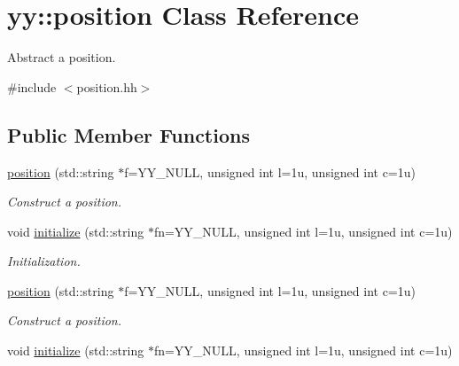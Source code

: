 \hypertarget{classyy_1_1position}{\section{yy\-:\-:position Class Reference}
\label{classyy_1_1position}
}


Abstract a position.  




{\ttfamily \#include $<$position.\-hh$>$}

\subsection*{Public Member Functions}
\begin{DoxyCompactItemize}
\item 
\hypertarget{classyy_1_1position_a636b0788d4eb92d6cf8fb7d0094feb2b}{\hyperlink{classyy_1_1position_a636b0788d4eb92d6cf8fb7d0094feb2b}{position} (std\-::string $\ast$f=Y\-Y\-\_\-\-N\-U\-L\-L, unsigned int l=1u, unsigned int c=1u)}\label{classyy_1_1position_a636b0788d4eb92d6cf8fb7d0094feb2b}

\begin{DoxyCompactList}\small\item\em Construct a position. \end{DoxyCompactList}\item 
\hypertarget{classyy_1_1position_add807c5b2364f8842ebd565cd1691d5b}{void \hyperlink{classyy_1_1position_add807c5b2364f8842ebd565cd1691d5b}{initialize} (std\-::string $\ast$fn=Y\-Y\-\_\-\-N\-U\-L\-L, unsigned int l=1u, unsigned int c=1u)}\label{classyy_1_1position_add807c5b2364f8842ebd565cd1691d5b}

\begin{DoxyCompactList}\small\item\em Initialization. \end{DoxyCompactList}\item 
\hypertarget{classyy_1_1position_a636b0788d4eb92d6cf8fb7d0094feb2b}{\hyperlink{classyy_1_1position_a636b0788d4eb92d6cf8fb7d0094feb2b}{position} (std\-::string $\ast$f=Y\-Y\-\_\-\-N\-U\-L\-L, unsigned int l=1u, unsigned int c=1u)}\label{classyy_1_1position_a636b0788d4eb92d6cf8fb7d0094feb2b}

\begin{DoxyCompactList}\small\item\em Construct a position. \end{DoxyCompactList}\item 
\hypertarget{classyy_1_1position_add807c5b2364f8842ebd565cd1691d5b}{void \hyperlink{classyy_1_1position_add807c5b2364f8842ebd565cd1691d5b}{initialize} (std\-::string $\ast$fn=Y\-Y\-\_\-\-N\-U\-L\-L, unsigned int l=1u, unsigned int c=1u)}\label{classyy_1_1position_add807c5b2364f8842ebd565cd1691d5b}


\end{DoxyCompactItemize}
